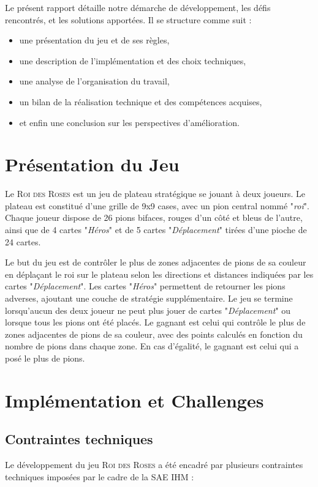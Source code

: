 Le présent rapport détaille notre démarche de développement, les défis rencontrés, et les solutions apportées. Il se structure comme suit :
\begin{itemize}
    \item une présentation du jeu et de ses règles,
    \item une description de l'implémentation et des choix techniques,
    \item une analyse de l'organisation du travail,
    \item un bilan de la réalisation technique et des compétences acquises,
    \item et enfin une conclusion sur les perspectives d'amélioration.
\end{itemize}

\section{Présentation du Jeu}

Le \textsc{Roi des Roses} est un jeu de plateau stratégique se jouant à deux joueurs.
Le plateau est constitué d'une grille de 9x9 cases, avec un pion central nommé "\emph{roi}".
Chaque joueur dispose de 26 pions bifaces, rouges d'un côté et bleus de l'autre, ainsi que de 4 cartes "\emph{Héros}" et de 5 cartes "\emph{Déplacement}" tirées d'une pioche de 24 cartes.

Le but du jeu est de contrôler le plus de zones adjacentes de pions de sa couleur en déplaçant le roi sur le plateau selon les directions et distances indiquées par les cartes "\emph{Déplacement}".
Les cartes "\emph{Héros}" permettent de retourner les pions adverses, ajoutant une couche de stratégie supplémentaire.
Le jeu se termine lorsqu'aucun des deux joueur ne peut plus jouer de cartes "\emph{Déplacement}" ou lorsque tous les pions ont été placés.
Le gagnant est celui qui contrôle le plus de zones adjacentes de pions de sa couleur, avec des points calculés en fonction du nombre de pions dans chaque zone.
En cas d’égalité, le gagnant est celui qui a posé le plus de pions.

\section{Implémentation et Challenges}

\subsection{Contraintes techniques}
Le développement du jeu \textsc{Roi des Roses} a été encadré par plusieurs contraintes techniques imposées par le cadre de la SAE IHM :
